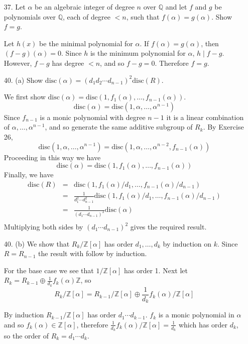 \documentclass{article}
\newcommand{\Q}[0]{\mathbb{Q}}
\newcommand{\Z}[0]{\mathbb{Z}}
\newcommand{\disc}[1]{\text{disc}(#1)}
\begin{document}
\begin{enumerate}
\item[37.] Let $\alpha$ be an algebraic integer of degree $n$ over $\Q$ and let $f$ and $g$ be polynomials over $\Q$, each of degree $< n$, such that $f(\alpha) = g(\alpha)$.  Show $f = g$.

Let $h(x)$ be the minimal polynomial for $\alpha$.  If $f(\alpha) = g(\alpha)$, then $(f - g)(\alpha) = 0$.  Since $h$ is the minimum polynomial for $\alpha$, $h \mid f - g$.  However, $f - g$ has degree $< n$, and so $f - g = 0$.  Therefore $f = g$.

\item[40. (a)] Show $\disc{\alpha} = (d_1 d_2 \cdots d_{n-1})^2 \disc{R}$.

We first show $\disc{\alpha} = \disc{1, f_1(\alpha), \ldots, f_{n-1}(\alpha)}$.  \[ \disc{\alpha} = \disc{1, \alpha, \ldots, \alpha^{n-1}} \]  Since $f_{n-1}$ is a monic polynomial with degree $n-1$ it is a linear combination of $\alpha, \ldots, \alpha^{n-1}$, and so generate the same additive subgroup of $R_{k}$.  By Exercise 26, \[ \disc{1, \alpha, \ldots, \alpha^{n-1}} = \disc{1, \alpha, \ldots, \alpha^{n-2}, f_{n-1}(\alpha)} \]  Proceeding in this way we have \[ \disc{\alpha} = \disc{1, f_1(\alpha), \ldots, f_{n-1}(\alpha)} \]
Finally, we have
\begin{eqnarray*}
    \disc{R} &=& \disc{1, f_1(\alpha)/d_1, \ldots, f_{n-1}(\alpha)/d_{n-1}} \\
    &=& \frac{1}{d_1^2 \cdots d_{n-1}^2} \disc{1, f_1(\alpha)/d_1, \ldots, f_{n-1}(\alpha)/d_{n-1}} \\
    &=& \frac{1}{(d_1 \cdots d_{n-1})^2} \disc{\alpha} \\
\end{eqnarray*}
Multiplying both sides by $(d_1 \cdots d_{n-1})^2$ gives the required result.

\item[40. (b)] We show that $R_{k} / \Z[\alpha]$ has order $d_1, \ldots, d_k$ by induction on $k$.  Since $R = R_{n-1}$ the result with follow by induction.

For the base case we see that $1 / \Z[\alpha]$ has order 1.  Next let $R_{k} = R_{k-1} \oplus\frac{1}{d_k} f_k(\alpha) \Z$, so \[ R_{k} / \Z[\alpha] = R_{k-1}/\Z[\alpha] \oplus \frac{1}{d_k} f_k(\alpha)/\Z[\alpha] \]

By induction $R_{k-1}/\Z[\alpha]$ has order $d_1\cdots d_{k-1}$.  $f_{k}$ is a monic polynomial in $\alpha$ and so $f_k(\alpha) \in \Z[\alpha]$, therefore $\frac{1}{d_k} f_k(\alpha)/\Z[\alpha] = \frac{1}{d_k}$ which has order $d_k$, so the order of $R_k = d_1 \cdots d_{k}$.


\end{enumerate}
\end{document}
